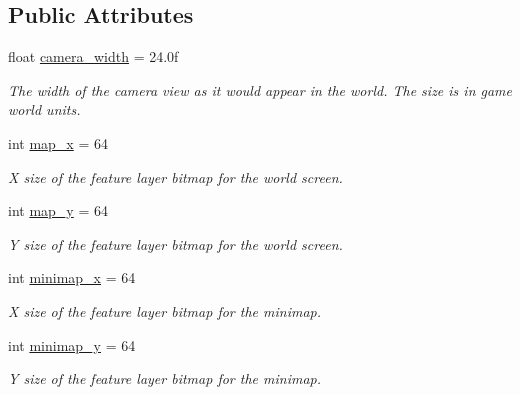 \subsection*{Public Attributes}
\begin{DoxyCompactItemize}
\item 
\mbox{\label{structsc2_1_1_feature_layer_settings_a3d585889888f6fab4324992fb74f4d32}} 
float \hyperlink{structsc2_1_1_feature_layer_settings_a3d585889888f6fab4324992fb74f4d32}{camera\+\_\+width} = 24.\+0f
\begin{DoxyCompactList}\small\item\em The width of the camera view as it would appear in the world. The size is in game world units. \end{DoxyCompactList}\item 
\mbox{\label{structsc2_1_1_feature_layer_settings_a621c94ea8be82e725ea0632126587067}} 
int \hyperlink{structsc2_1_1_feature_layer_settings_a621c94ea8be82e725ea0632126587067}{map\+\_\+x} = 64
\begin{DoxyCompactList}\small\item\em X size of the feature layer bitmap for the world screen. \end{DoxyCompactList}\item 
\mbox{\label{structsc2_1_1_feature_layer_settings_a17b45c8a4de7ff44bb18d79de5fe4532}} 
int \hyperlink{structsc2_1_1_feature_layer_settings_a17b45c8a4de7ff44bb18d79de5fe4532}{map\+\_\+y} = 64
\begin{DoxyCompactList}\small\item\em Y size of the feature layer bitmap for the world screen. \end{DoxyCompactList}\item 
\mbox{\label{structsc2_1_1_feature_layer_settings_a22ff2b541326b90567bb1f8986f8fe68}} 
int \hyperlink{structsc2_1_1_feature_layer_settings_a22ff2b541326b90567bb1f8986f8fe68}{minimap\+\_\+x} = 64
\begin{DoxyCompactList}\small\item\em X size of the feature layer bitmap for the minimap. \end{DoxyCompactList}\item 
\mbox{\label{structsc2_1_1_feature_layer_settings_a8cf3d9f547f3fca567f443e8081bfb4f}} 
int \hyperlink{structsc2_1_1_feature_layer_settings_a8cf3d9f547f3fca567f443e8081bfb4f}{minimap\+\_\+y} = 64
\begin{DoxyCompactList}\small\item\em Y size of the feature layer bitmap for the minimap. \end{DoxyCompactList}\end{DoxyCompactItemize}


